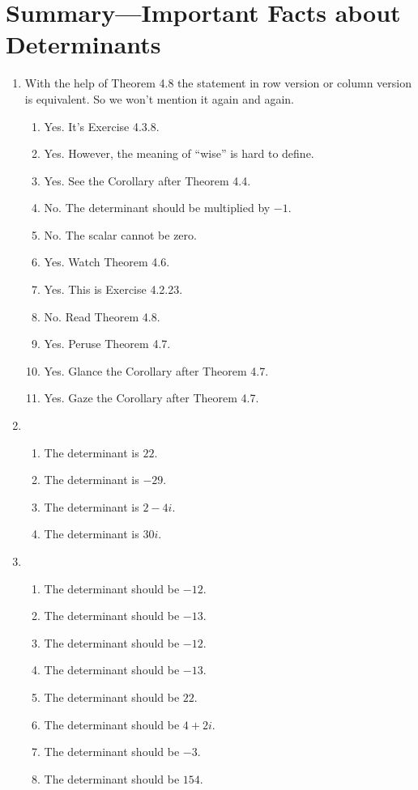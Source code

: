 \section{Summary---Important Facts about Determinants}
\begin{enumerate}
\item With the help of Theorem 4.8 the statement in row version or column version is equivalent. So we won't mention it again and again.\begin{enumerate}
\item Yes. It's Exercise 4.3.8.
\item Yes.  However, the meaning of ``wise'' is hard to define.
\item Yes. See the Corollary after Theorem 4.4.
\item No. The determinant should be multiplied by $-1$.
\item No. The scalar cannot be zero.
\item Yes. Watch Theorem 4.6.
\item Yes. This is Exercise 4.2.23.
\item No. Read Theorem 4.8.
\item Yes. Peruse Theorem 4.7.
\item Yes. Glance the Corollary after Theorem 4.7.
\item Yes. Gaze the Corollary after Theorem 4.7.
\end{enumerate}
\item \begin{enumerate}
\item The determinant is $22$.
\item The determinant is $-29$.
\item The determinant is $2-4i$.
\item The determinant is $30i$.
\end{enumerate}
\item \begin{enumerate}
\item The determinant should be $-12$.
\item The determinant should be $-13$.
\item The determinant should be $-12$.
\item The determinant should be $-13$.
\item The determinant should be $22$.
\item The determinant should be $4+2i$.
\item The determinant should be $-3$.
\item The determinant should be $154$.

\end{enumerate}
\end{enumerate}
